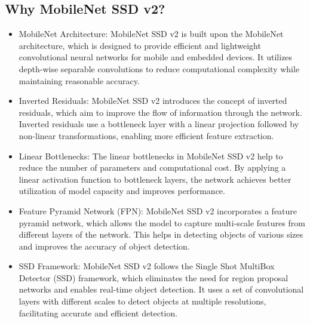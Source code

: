 \subsection{Why MobileNet SSD v2?}
\begin{itemize}
    \item MobileNet Architecture: MobileNet SSD v2 is built upon the MobileNet architecture, which is designed to provide efficient and lightweight convolutional neural networks for mobile and embedded devices. It utilizes depth-wise separable convolutions to reduce computational complexity while maintaining reasonable accuracy.
    \item Inverted Residuals: MobileNet SSD v2 introduces the concept of inverted residuals, which aim to improve the flow of information through the network. Inverted residuals use a bottleneck layer with a linear projection followed by non-linear transformations, enabling more efficient feature extraction.
    \item Linear Bottlenecks: The linear bottlenecks in MobileNet SSD v2 help to reduce the number of parameters and computational cost. By applying a linear activation function to bottleneck layers, the network achieves better utilization of model capacity and improves performance.
    \item Feature Pyramid Network (FPN): MobileNet SSD v2 incorporates a feature pyramid network, which allows the model to capture multi-scale features from different layers of the network. This helps in detecting objects of various sizes and improves the accuracy of object detection.
    \item SSD Framework: MobileNet SSD v2 follows the Single Shot MultiBox Detector (SSD) framework, which eliminates the need for region proposal networks and enables real-time object detection. It uses a set of convolutional layers with different scales to detect objects at multiple resolutions, facilitating accurate and efficient detection.
\end{itemize}

